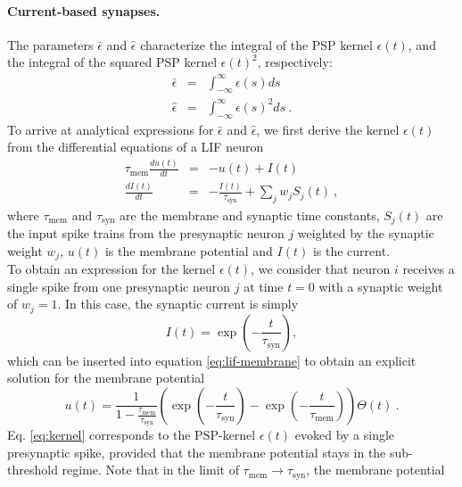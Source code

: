 \documentclass[11pt,a4paper]{article}
\begin{document}
\begin{refsection}
\paragraph{Current-based synapses.} 
The parameters $\bar\epsilon$ and
$\hat\epsilon$ characterize the integral of the \ac{PSP} kernel $\epsilon(t)$, and the integral of the squared \ac{PSP} kernel $\epsilon(t)^2$, respectively:
\begin{eqnarray}    
    \bar\epsilon &=& \int_{-\infty}^\infty \epsilon(s) ds 
    \label{eq:ebar}\\
    \hat\epsilon &=& \int_{-\infty}^\infty \epsilon(s)^2 ds~.
    \label{eq:ehat}
\end{eqnarray} 
To arrive at analytical expressions for $\bar\epsilon$ and
$\hat\epsilon$, we first derive the kernel $\epsilon(t)$ from the differential equations of a \ac{LIF} neuron \citep{Gerstner2002}
\begin{eqnarray}
\tau_{\text{mem}} \frac{du(t)}{dt} &=& -u(t) + I(t) 
\label{eq:lif-membrane} 
\\
\frac{dI(t)}{dt} &=& -\frac{I(t)}{\tau_{\text{syn}}} + \sum_j w_jS_j(t)~,
\label{eq:lif-current}
\end{eqnarray}
where $\tau_{\text{mem}}$ and $\tau_{\text{syn}}$ are the membrane and synaptic time constants, $S_{j}(t)$ are the input spike trains from the presynaptic neuron $j$ weighted by the synaptic weight $w_j$, $u(t)$ is the membrane potential and $I(t)$ is the current.\\
To obtain an expression for the kernel $\epsilon(t)$, we consider that neuron
$i$ receives a single spike from one presynaptic neuron $j$ at time $t=0$ with
a synaptic weight of $w_j=1$. In this case, the synaptic current is simply
\begin{equation}
    I(t) = \exp\left(-\frac{t}{\tau_{\text{syn}}}\right),
\end{equation}
which can be inserted into equation \eqref{eq:lif-membrane} to obtain an
explicit solution for the membrane potential
\begin{equation} \label{eq:kernel}
u(t) = \frac{1}{1-\frac{\tau_{\text{mem}}}{\tau_{\text{syn}}}}
\left(\exp\left(-\frac{t}{\tau_{\text{syn}}}\right)-
\exp\left(-\frac{t}{\tau_{\text{mem}}}\right)\right) \Theta(t)~.
\end{equation}
Eq. \eqref{eq:kernel} corresponds to the \ac{PSP}-kernel $\epsilon(t)$ evoked
by a single presynaptic spike, provided that the membrane potential stays in
the sub-threshold regime. Note that in the limit of
$\tau_{\text{mem}}\rightarrow \tau_{\text{syn}}$, the membrane potential

\end{refsection}
\end{document}
